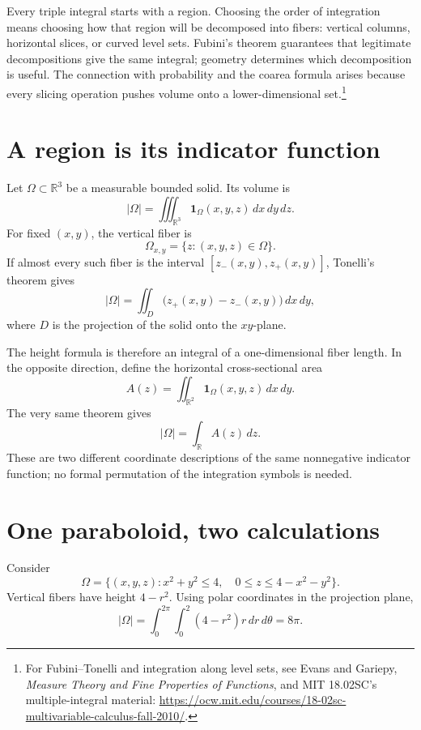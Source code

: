 
Every triple integral starts with a region. Choosing the order of integration means choosing how that region will be decomposed into fibers: vertical columns, horizontal slices, or curved level sets. Fubini's theorem guarantees that legitimate decompositions give the same integral; geometry determines which decomposition is useful. The connection with probability and the coarea formula arises because every slicing operation pushes volume onto a lower-dimensional set.\footnote{For Fubini--Tonelli and integration along level sets, see Evans and Gariepy, \emph{Measure Theory and Fine Properties of Functions}, and MIT 18.02SC's multiple-integral material: \url{https://ocw.mit.edu/courses/18-02sc-multivariable-calculus-fall-2010/}.}

\section{A region is its indicator function}

Let \(\Omega\subset\mathbb R^3\) be a measurable bounded solid. Its volume is
\[
 |\Omega|=\iiint_{\mathbb R^3}\mathbf1_\Omega(x,y,z)\,dx\,dy\,dz.
\]
For fixed \((x,y)\), the vertical fiber is
\[
 \Omega_{x,y}=\{z:(x,y,z)\in\Omega\}.
\]
If almost every such fiber is the interval
\([z_-(x,y),z_+(x,y)]\), Tonelli's theorem gives
\[
 |\Omega|=\iint_D\bigl(z_+(x,y)-z_-(x,y)\bigr)\,dx\,dy,
\]
where \(D\) is the projection of the solid onto the \(xy\)-plane.

The height formula is therefore an integral of a one-dimensional fiber length. In the opposite direction, define the horizontal cross-sectional area
\[
 A(z)=\iint_{\mathbb R^2}\mathbf1_\Omega(x,y,z)\,dx\,dy.
\]
The very same theorem gives
\[
 \boxed{|\Omega|=\int_{\mathbb R}A(z)\,dz.}
\]
These are two different coordinate descriptions of the same nonnegative indicator function; no formal permutation of the integration symbols is needed.

\section{One paraboloid, two calculations}

Consider
\[
 \Omega=\{(x,y,z):x^2+y^2\le4,\quad
           0\le z\le4-x^2-y^2\}.
\]
Vertical fibers have height \(4-r^2\). Using polar coordinates in the projection plane,
\[
 |\Omega|
 =\int_0^{2\pi}\int_0^2(4-r^2)r\,dr\,d\theta
 =8\pi.
\]


